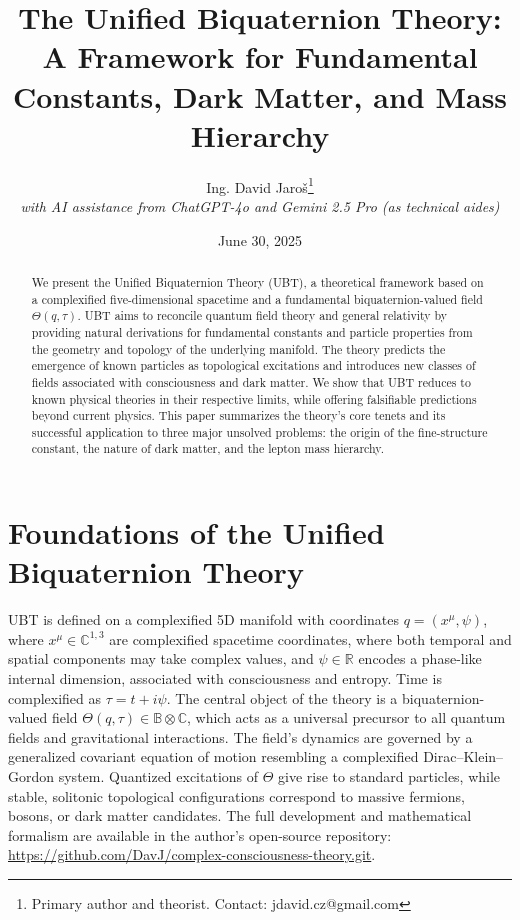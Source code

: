\documentclass[12pt, a4paper]{article}
\title{\textbf{The Unified Biquaternion Theory: A Framework for Fundamental Constants, Dark Matter, and Mass Hierarchy}}
\author{Ing. David Jaro\v{s}\thanks{Primary author and theorist. Contact: jdavid.cz@gmail.com} \\
\textit{with AI assistance from ChatGPT-4o and Gemini 2.5 Pro (as technical aides)}}
\date{June 30, 2025}
\begin{document}
\maketitle

\begin{abstract}
We present the Unified Biquaternion Theory (UBT), a theoretical framework based on a complexified five-dimensional spacetime and a fundamental biquaternion-valued field \( \Theta(q, \tau) \). UBT aims to reconcile quantum field theory and general relativity by providing natural derivations for fundamental constants and particle properties from the geometry and topology of the underlying manifold. The theory predicts the emergence of known particles as topological excitations and introduces new classes of fields associated with consciousness and dark matter. We show that UBT reduces to known physical theories in their respective limits, while offering falsifiable predictions beyond current physics. This paper summarizes the theory's core tenets and its successful application to three major unsolved problems: the origin of the fine-structure constant, the nature of dark matter, and the lepton mass hierarchy.
\end{abstract}

\tableofcontents
\newpage

\section{Foundations of the Unified Biquaternion Theory}
UBT is defined on a complexified 5D manifold with coordinates \( q = (x^\mu, \psi) \), where \( x^\mu \in \mathbb{C}^{1,3} \) are complexified spacetime coordinates, where both temporal and spatial components may take complex values, and \( \psi \in \mathbb{R} \) encodes a phase-like internal dimension, associated with consciousness and entropy. Time is complexified as \( \tau = t + i\psi \). The central object of the theory is a biquaternion-valued field \( \Theta(q, \tau) \in \mathbb{B} \otimes \mathbb{C} \), which acts as a universal precursor to all quantum fields and gravitational interactions. The field's dynamics are governed by a generalized covariant equation of motion resembling a complexified Dirac--Klein--Gordon system. Quantized excitations of \( \Theta \) give rise to standard particles, while stable, solitonic topological configurations correspond to massive fermions, bosons, or dark matter candidates. The full development and mathematical formalism are available in the author's open-source repository: \url{https://github.com/DavJ/complex-consciousness-theory.git}.
\end{document}
